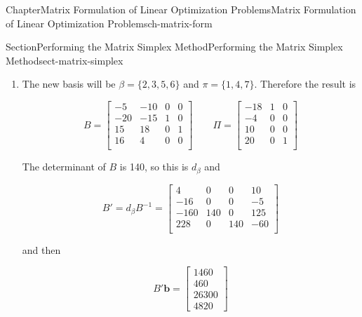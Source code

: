 \documentclass[oneside,10pt,]{book}
\numberwithin{equation}{section}
\newcommand{\amp}{&}
\begin{document}
\begin{chapterptx}{Chapter}{Matrix Formulation of Linear Optimization Problems}{}{Matrix Formulation of Linear Optimization Problems}{}{}{ch-matrix-form}
\begin{sectionptx}{Section}{Performing the Matrix Simplex Method}{}{Performing the Matrix Simplex Method}{}{}{sect-matrix-simplex}
\begin{introduction}{}
\begin{enumerate}
\begin{equation*}
\end{equation*}
%
\par
The smallest (most negative) number in \(B' \boldsymbol{b}\) is in the last row, so the leaving variable is the corresponding leaving variable is the last basis variable or \(x_7\). The entering variable will be the largest negative in the 4th row of \(B'\Pi\), which occurs in the 2nd column, so the entering variable is the second parameter or \(x_3\). We then perform a pivot \(3 \mapsto 7\).%
\item{}The new basis will be \(\beta = \{2,3,5,6\}\) and \(\pi=\{1,4,7\}\). Therefore the result is%
\par
%
\begin{equation*}
B = \begin{bmatrix} -5 \amp -10 \amp 0 \amp 0 \\ -20 \amp -15 \amp 1 \amp 0 \\ 15 \amp  18 \amp 0 \amp 1 \\ 16 \amp   4 \amp 0 \amp 0 \\ \end{bmatrix} \qquad \Pi = \begin{bmatrix} -18 \amp 1 \amp 0 \\ -4 \amp 0 \amp 0 \\ 10 \amp 0 \amp 0 \\ 20 \amp 0 \amp 1 \\ \end{bmatrix}
\end{equation*}
%
\par
The determinant of \(B\) is 140, so this is \(d_{\beta}\) and%
\par
%
\begin{equation*}
B' = d_{\beta} B^{-1} = \begin{bmatrix} 4 \amp   0 \amp   0 \amp  10 \\ -16 \amp   0 \amp   0 \amp  -5 \\ -160 \amp 140 \amp   0 \amp 125 \\ 228 \amp   0 \amp 140 \amp -60 \\ \end{bmatrix}
\end{equation*}
%
\par
and then%
\par
%
\begin{equation*}
B' \boldsymbol{b} = \begin{bmatrix}  1460 \\  460 \\ 26300 \\  4820 \end{bmatrix}

\end{equation*}
\end{enumerate}
\end{introduction}
\end{sectionptx}
\end{chapterptx}
\end{document}
